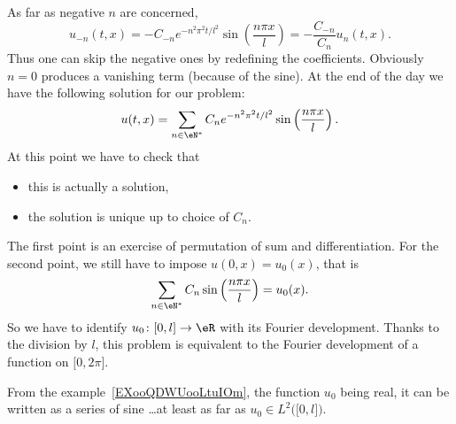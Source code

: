 As far as negative \( n\) are concerned,
\begin{equation}
	u_{-n}(t,x)=-C_{-n} e^{-n^2\pi^2 t/l^2}\sin\left( \frac{ n\pi x }{ l } \right)=-\frac{ C_{-n} }{C_n  }u_n(t,x).
\end{equation}
Thus one can skip the negative ones by redefining the coefficients. Obviously \( n=0\) produces a vanishing term (because of the sine). At the end of the day we have the following solution for our problem:
\begin{equation}
	u(t,x)=\sum_{n\in \eN^*}C_n e^{-n^2\pi^2 t/l^2}\sin\left( \frac{ n\pi x }{ l } \right).
\end{equation}
At this point we have to check that
\begin{itemize}
	\item this is actually a solution,
	\item the solution is unique up to choice of \( C_n\).
\end{itemize}
The first point is an exercise of permutation of sum and differentiation. For the second point, we still have to impose \( u(0,x)=u_0(x)\), that is
\begin{equation}
	\sum_{n\in \eN^*}C_n\sin\left( \frac{ n\pi x }{ l } \right)=u_0(x).
\end{equation}
So we have to identify \( u_0\colon  \mathopen[ 0 , l \mathclose]\to \eR \) with its Fourier development. Thanks to the division by \( l\), this problem is equivalent to the Fourier development of a function on \( \mathopen[ 0 , 2\pi \mathclose]\).

From the example~\ref{EXooQDWUooLtuIOm}, the function \( u_0\) being real, it can be written as a series of sine \ldots at least as far as \( u_0\in L^2\big( \mathopen[ 0 , l \mathclose] \big)\).
